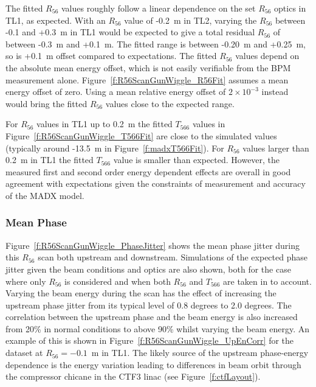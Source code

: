 The fitted \(R_{56}\) values roughly follow a linear dependence on the set \(R_{56}\) optics in TL1, as expected. With an \(R_{56}\) value of -0.2~m in TL2, varying the \(R_{56}\) between -0.1 and +0.3~m in TL1 would be expected to give a total residual \(R_{56}\) of between -0.3~m and +0.1~m. The fitted range is between -0.20~m and +0.25~m, so is +0.1~m offset compared to expectations. The fitted \(R_{56}\) values depend on the absolute mean energy offset, which is not easily verifiable from the BPM measurement alone. Figure~\ref{f:R56ScanGunWiggle_R56Fit} assumes a mean energy offset of zero. Using a mean relative energy offset of \(2\times10^{-3}\) instead would bring the fitted \(R_{56}\) values close to the expected range.

For \(R_{56}\) values in TL1 up to 0.2~m the fitted \(T_{566}\) values in Figure~\ref{f:R56ScanGunWiggle_T566Fit} are close to the simulated values (typically around -13.5~m in Figure~\ref{f:madxT566Fit}). For \(R_{56}\) values larger than 0.2~m in TL1 the fitted \(T_{566}\) value is smaller than expected. However, the measured first and second order energy dependent effects are overall in good agreement with expectations given the constraints of measurement and accuracy of the MADX model.


\subsubsection{Mean Phase}

Figure~\ref{f:R56ScanGunWiggle_PhaseJitter} shows the mean phase jitter during this \(R_{56}\) scan both upstream and downstream. Simulations of the expected phase jitter given the beam conditions and optics are also shown, both for the case where only \(R_{56}\) is considered and when both \(R_{56}\) and \(T_{566}\) are taken in to account. Varying the beam energy during the scan has the effect of increasing the upstream phase jitter from its typical level of 0.8 degrees to 2.0 degrees. The correlation between the upstream phase and the beam energy is also increased from 20\% in normal conditions to above 90\% whilst varying the beam energy. An example of this is shown in Figure~\ref{f:R56ScanGunWiggle_UpEnCorr} for the dataset at \(R_{56}=-0.1\)~m in TL1. The likely source of the upstream phase-energy dependence is the energy variation leading to differences in beam orbit through the compressor chicane in the CTF3 linac (see Figure~\ref{f:ctfLayout}).

